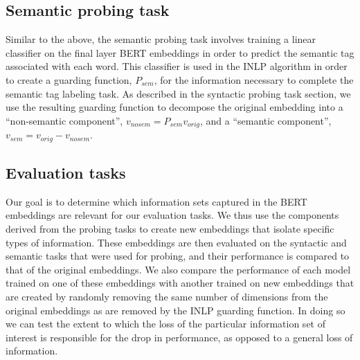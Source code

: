 \documentclass[11pt,a4paper]{article}
\begin{document}
\subsection{Semantic probing task}
\label{sec:semantics}

Similar to the above, the semantic probing task involves training a linear classifier on the final layer BERT embeddings in order to predict the semantic tag associated with each word. This classifier is used in the INLP algorithm in order to create a guarding function, $P_{sem}$, for the information necessary to complete the semantic tag labeling task. As described in the syntactic probing task section, we use the resulting guarding function to decompose the original embedding into a ``non-semantic component'', $v_{no sem} = P_{sem} v_{orig}$, and a ``semantic component'', $v_{sem} = v_{orig} - v_{no sem}$. 


\subsection{Evaluation tasks}
\label{sec:eval}

Our goal is to determine which information sets captured in the BERT embeddings are relevant for our evaluation tasks. We thus use the components derived from the probing tasks to create new embeddings that isolate specific types of information. These embeddings are then evaluated on the syntactic and semantic tasks that were used for probing, and their performance is compared to that of the original embeddings. We also compare the performance of each model trained on one of these embeddings with another trained on new embeddings that are created by randomly removing the same number of dimensions from the original embeddings as are removed by the INLP guarding function. In doing so we can test the extent to which the loss of the particular information set of interest is responsible for the drop in performance, as opposed to a general loss of information. 

\end{document}
